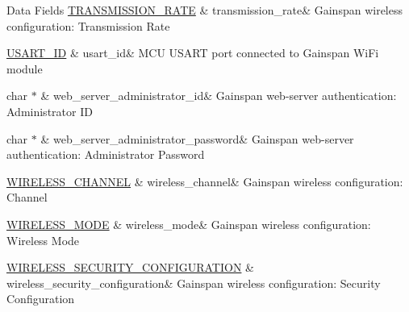 \begin{DoxyFields}{Data Fields}
\hyperlink{group__wireless__interface_ga5fe34de02ca1d34a33910a3c1cadab18}{T\+R\+A\+N\+S\+M\+I\+S\+S\+I\+O\+N\+\_\+\+R\+A\+TE}\hypertarget{group__wireless__interface_a93829056fd2c703fab1361bf93a8ab97}{}\label{group__wireless__interface_a93829056fd2c703fab1361bf93a8ab97}
&
transmission\+\_\+rate&
Gainspan wireless configuration\+: Transmission Rate \\
\hline

\hyperlink{group__usart_async_module_gaae3c5ea77a411e5f40e4377f77067b86}{U\+S\+A\+R\+T\+\_\+\+ID}\hypertarget{group__wireless__interface_a57da4a11f1a1976c01d526cc89aab346}{}\label{group__wireless__interface_a57da4a11f1a1976c01d526cc89aab346}
&
usart\+\_\+id&
M\+CU U\+S\+A\+RT port connected to Gainspan Wi\+Fi module \\
\hline

char $\ast$\hypertarget{group__wireless__interface_aa07e996c48bf699d258fbdb3b709119d}{}\label{group__wireless__interface_aa07e996c48bf699d258fbdb3b709119d}
&
web\+\_\+server\+\_\+administrator\+\_\+id&
Gainspan web-\/server authentication\+: Administrator ID \\
\hline

char $\ast$\hypertarget{group__wireless__interface_a4f18df0287a3c56f0741766f2bd61f93}{}\label{group__wireless__interface_a4f18df0287a3c56f0741766f2bd61f93}
&
web\+\_\+server\+\_\+administrator\+\_\+password&
Gainspan web-\/server authentication\+: Administrator Password \\
\hline

\hyperlink{group__wireless__interface_ga5d523cadfff48b2f9feb3e16491ce04f}{W\+I\+R\+E\+L\+E\+S\+S\+\_\+\+C\+H\+A\+N\+N\+EL}\hypertarget{group__wireless__interface_ae4b06bebe97fac7b8289a8766e6970c8}{}\label{group__wireless__interface_ae4b06bebe97fac7b8289a8766e6970c8}
&
wireless\+\_\+channel&
Gainspan wireless configuration\+: Channel \\
\hline

\hyperlink{group__wireless__interface_gaf3e0c98d38c9b4b8b78f40523ae08711}{W\+I\+R\+E\+L\+E\+S\+S\+\_\+\+M\+O\+DE}\hypertarget{group__wireless__interface_af916c89df87df612ef0327699407b85f}{}\label{group__wireless__interface_af916c89df87df612ef0327699407b85f}
&
wireless\+\_\+mode&
Gainspan wireless configuration\+: Wireless Mode \\
\hline

\hyperlink{group__wireless__interface_gab937e212876c914a187986c349918053}{W\+I\+R\+E\+L\+E\+S\+S\+\_\+\+S\+E\+C\+U\+R\+I\+T\+Y\+\_\+\+C\+O\+N\+F\+I\+G\+U\+R\+A\+T\+I\+ON}\hypertarget{group__wireless__interface_ae19095fa33f0ad6cd22bafb45d4d6179}{}\label{group__wireless__interface_ae19095fa33f0ad6cd22bafb45d4d6179}
&
wireless\+\_\+security\+\_\+configuration&
Gainspan wireless configuration\+: Security Configuration \\
\hline

\end{DoxyFields}
\label{struct_w_i_r_e_l_e_s_s___p_r_o_f_i_l_e}
\hypertarget{group__wireless__interface_struct_w_i_r_e_l_e_s_s___p_r_o_f_i_l_e}{}
